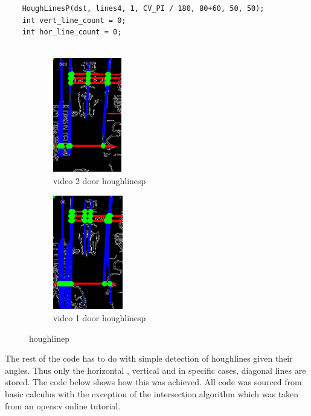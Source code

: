 \documentclass{article}
\begin{document}
\begin{lstlisting}
	HoughLinesP(dst, lines4, 1, CV_PI / 180, 80+60, 50, 50);
	int vert_line_count = 0;
	int hor_line_count = 0;
	
\end{lstlisting}


\begin{figure}[H]
\begin{subfigure}{0.5\textwidth}
\includegraphics[width=0.5\linewidth, height=5cm]{door_closed_h_v.PNG} 
\caption{video 2 door houghlinesp}
\label{fig:subim1}
\end{subfigure}
\begin{subfigure}{0.5\textwidth}
\includegraphics[width=0.5\linewidth, height=5cm]{door2_h_v.PNG}
\caption{video 1 door houghlinesp}
\label{fig:subim2}
\end{subfigure}
\caption{houghlinep}
\label{fig:image2}
\end{figure}


The rest of the code has to do with simple detection of houghlines given their angles. Thus only the horizontal , vertical and in specific cases, diagonal lines are stored. The code below shows how this was achieved. All code was sourced from basic calculus with the exception of the intersection algorithm which was taken from an opencv online tutorial.
\end{document}
